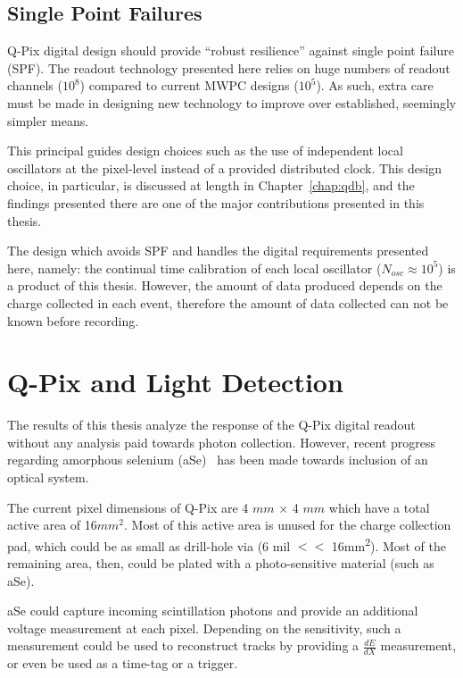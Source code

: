 \subsection{Single Point Failures}
Q-Pix digital design should provide ``robust resilience'' against single point failure (SPF).
The readout technology presented here relies on huge numbers of readout channels ($10^{8}$) compared to current MWPC designs ($10^{5}$).
As such, extra care must be made in designing new technology to improve over established, seemingly simpler means.

This principal guides design choices such as the use of independent local oscillators at the pixel-level instead of a provided distributed clock.
This design choice, in particular, is discussed at length in Chapter~\ref{chap:qdb}, and the findings presented there are one of the major contributions presented in this thesis.

The design which avoids SPF and handles the digital requirements presented here, namely: the continual time calibration of each local oscillator ($N_{osc} \approx 10^{5}$) is a product of this thesis.
However, the amount of data produced depends on the charge collected in each event, therefore the amount of data collected can not be known before recording.

\section{Q-Pix and Light Detection}
\label{sec:qpix_photonics}
The results of this thesis analyze the response of the Q-Pix digital readout without any analysis paid towards photon collection.
However, recent progress regarding amorphous selenium (aSe)~\citep{https://doi.org/10.48550/arxiv.2207.11127} has been made towards inclusion of an optical system.

The current pixel dimensions of Q-Pix are 4 $\unit{mm}$ $\times$ 4 $\unit{mm} $ which have a total active area of 16$\unit{mm^{2}}$.
Most of this active area is unused for the charge collection pad, which could be as small as drill-hole via (6 mil $<<$ 16\unit{mm^2}).
Most of the remaining area, then, could be plated with a photo-sensitive material (such as aSe).

aSe could capture incoming scintillation photons and provide an additional voltage measurement at each pixel.
Depending on the sensitivity, such a measurement could be used to reconstruct tracks by providing a $\frac{dE}{dX}$ measurement, or even be used as a time-tag or a trigger.

